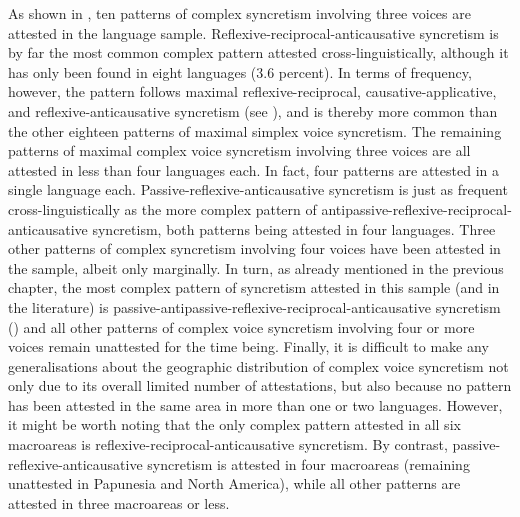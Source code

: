 As shown in , ten patterns of complex syncretism involving three voices are attested in the language sample. Reflexive-reciprocal-anticausative syncretism is by far the most common complex pattern attested cross-linguisti\-cally, although it has only been found in eight languages (3.6 percent). In terms of frequency, however, the pattern follows maximal reflexive-reciprocal, causative-applicative, and reflexive-anticausative syncretism (see ), and is thereby more common than the other eighteen patterns of maximal simplex voice syncretism. The remaining patterns of maximal complex voice syncretism involving three voices are all attested in less than four languages each. In fact, four patterns are attested in a single language each. Passive-reflexive-anticausative syncretism is just as frequent cross-linguistically as the more complex pattern of antipassive-reflexive-reciprocal-anticausative syncretism, both patterns being attested in four languages. Three other patterns of complex syncretism involving four voices have been attested in the sample, albeit only marginally. In turn, as already mentioned in the previous chapter, the most complex pattern of syncretism attested in this sample (and in the literature) is passive-antipassive-reflexive-reciprocal-anticausative syncretism () and all other patterns of complex voice syncretism involving four or more voices remain unattested for the time being. Finally, it is difficult to make any generalisations about the geographic distribution of complex voice syncretism not only due to its overall limited number of attestations, but also because no pattern has been attested in the same area in more than one or two languages. However, it might be worth noting that the only complex pattern attested in all six macroareas is reflexive-reciprocal-anticausative syncretism. By contrast, passive-reflexive-anticausative syncretism is attested in four macroareas (remaining unattested in Papunesia and North America), while all other patterns are attested in three macroareas or less.


